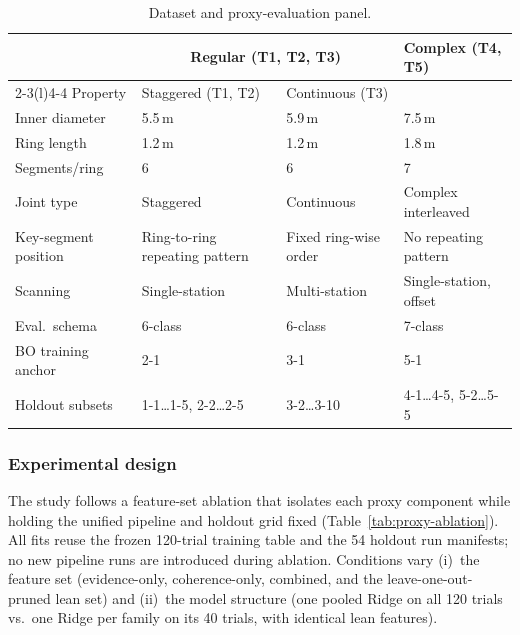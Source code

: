 \documentclass[a4paper,fleqn]{cas-dc}
\begin{document}
\begin{table}[t]
\caption{Dataset and proxy-evaluation panel.}\label{tab:dataset}
\begin{tabular*}{\textwidth}{@{\extracolsep{\fill}} l l l l @{}}
\toprule
 & \multicolumn{2}{c}{Regular (T1, T2, T3)} & Complex (T4, T5) \\
\cmidrule(lr){2-3}\cmidrule(l){4-4}
Property & Staggered (T1, T2) & Continuous (T3) & \\
\midrule
Inner diameter & 5.5\,m & 5.9\,m & 7.5\,m \\
Ring length & 1.2\,m & 1.2\,m & 1.8\,m \\
Segments/ring & 6 & 6 & 7 \\
Joint type & Staggered & Continuous & Complex interleaved \\
Key-segment position & Ring-to-ring repeating pattern & Fixed ring-wise order & No repeating pattern \\
Scanning & Single-station & Multi-station & Single-station, offset \\
Eval.\ schema & 6-class & 6-class & 7-class \\
BO training anchor & 2-1 & 3-1 & 5-1 \\
Holdout subsets & 1-1{\ldots}1-5, 2-2{\ldots}2-5 & 3-2{\ldots}3-10 & 4-1{\ldots}4-5, 5-2{\ldots}5-5 \\
\bottomrule
\end{tabular*}
\end{table}

\subsubsection{Experimental design}\label{sec:comparators}

The study follows a feature-set ablation that isolates each proxy component while holding the unified pipeline and holdout grid fixed (Table~\ref{tab:proxy-ablation}). All fits reuse the frozen 120-trial training table and the 54 holdout run manifests; no new pipeline runs are introduced during ablation. Conditions vary (i)~the feature set (evidence-only, coherence-only, combined, and the leave-one-out-pruned lean set) and (ii)~the model structure (one pooled Ridge on all 120 trials vs.\ one Ridge per family on its 40 trials, with identical lean features).
\end{document}
